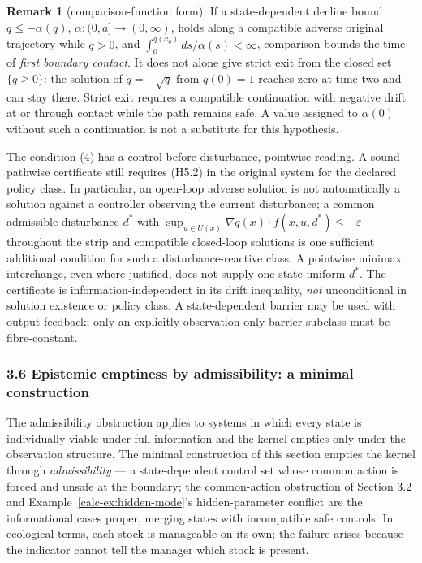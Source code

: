 \documentclass[10pt,twocolumn]{article}
\theoremstyle{definition}
\newtheorem{remark}{Remark}
\begin{document}
\begin{remark}[comparison-function form]\label{calc-rem:comparison}
If a state-dependent decline bound \(\dot q\le-\alpha(q)\), \(\alpha:(0,a]\to(0,\infty)\), holds along a compatible adverse original trajectory while \(q>0\), and \(\int_0^{q(x_0)}ds/\alpha(s)<\infty\), comparison bounds the time of \emph{first boundary contact}. It does not alone give strict exit from the closed set \(\{q\ge0\}\): the solution of \(\dot q=-\sqrt q\) from \(q(0)=1\) reaches zero at time two and can stay there. Strict exit requires a compatible continuation with negative drift at or through contact while the path remains safe. A value assigned to \(\alpha(0)\) without such a continuation is not a substitute for this hypothesis.
\end{remark}

The condition (4) has a control-before-disturbance, pointwise reading. A sound pathwise certificate still requires (H5.2) in the original system for the declared policy class. In particular, an open-loop adverse solution is not automatically a solution against a controller observing the current disturbance; a common admissible disturbance \(d^*\) with \(\sup_{u\in U(x)}\nabla q(x)\cdot f(x,u,d^*)\le-\varepsilon\) throughout the strip and compatible closed-loop solutions is one sufficient additional condition for such a disturbance-reactive class. A pointwise minimax interchange, even where justified, does not supply one state-uniform \(d^*\). The certificate is information-independent in its drift inequality, \emph{not} unconditional in solution existence or policy class. A state-dependent barrier may be used with output feedback; only an explicitly observation-only barrier subclass must be fibre-constant.

\subsubsection{3.6 Epistemic emptiness by admissibility: a minimal
construction}\label{calc-epistemic-emptiness-by-admissibility-a-minimal-construction}

The admissibility obstruction applies to systems in which every state is
individually viable under full information and the kernel empties only under the observation structure.
The minimal construction of this section empties the kernel through
\emph{admissibility} --- a state-dependent control set whose common
action is forced and unsafe at the boundary; the common-action
obstruction of Section 3.2 and Example~\ref{calc-ex:hidden-mode}'s hidden-parameter
conflict are the informational cases proper, merging states with
incompatible safe controls. In ecological terms, each stock is manageable on its own; the failure arises because the indicator cannot tell the manager which stock is present.
\end{document}
